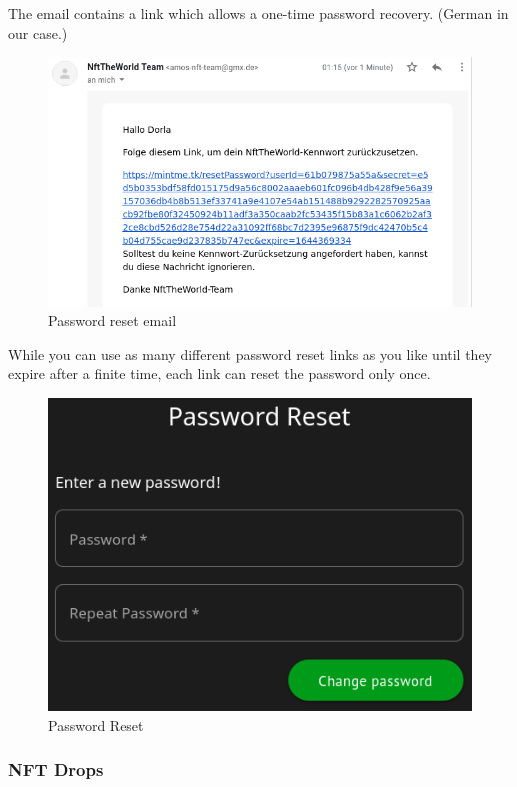 \documentclass[
]{article}
\begin{document}
The email contains a link which allows a one-time password recovery.
(German in our case.)

\begin{figure}
\centering
\includegraphics{images/reset_password_mail.png}
\caption{Password reset email}
\end{figure}\newpage

While you can use as many different password reset links as you like
until they expire after a finite time, each link can reset the password
only once.

\begin{figure}
\centering
\includegraphics{images/password_reset.png}
\caption{Password Reset}
\end{figure}\newpage

\hypertarget{nft-drops}{%
\subsubsection{NFT Drops}\label{nft-drops}}
\end{document}
